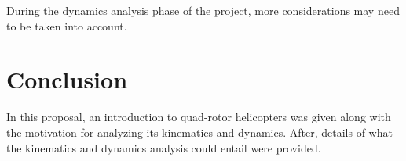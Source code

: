 \documentclass[journal]{IEEEtran}
\begin{document}
During the dynamics analysis phase of the project, more considerations may need to be
taken into account. 

\section{Conclusion}
In this proposal, an introduction to quad-rotor helicopters was given along with 
the motivation for analyzing its kinematics and dynamics. After, details of what
the kinematics and dynamics analysis could entail were provided. 



\end{document}
